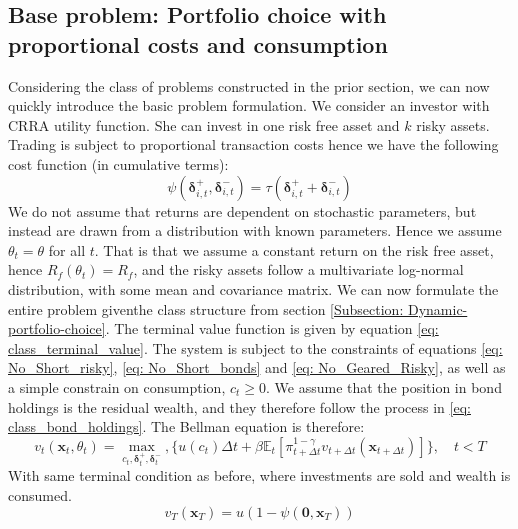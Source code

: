 \documentclass[11pt]{article}
\begin{document}
\subsection{Base problem: Portfolio choice with proportional costs and consumption}\label{Subsection: Base_Problem}
Considering the class of problems constructed in the prior section,
we can now quickly introduce the basic problem formulation.
We consider an investor with CRRA utility function. She can invest in one risk free asset and $k$ risky assets.
Trading is subject to proportional transaction costs hence we have the following cost function (in cumulative terms):
\begin{equation} \label{eq: base_model_transaction-cost}
  \psi (\boldsymbol{\delta}^{+}_{i,t}, \boldsymbol{\delta}^{-}_{i,t} ) = \tau (\boldsymbol{\delta}^{+}_{i,t} + \boldsymbol{\delta}^{-}_{i,t}) 
\end{equation}
We do not assume that returns are dependent on stochastic parameters, but instead are drawn from a distribution with known parameters.
Hence we assume \( \theta_{t} = \theta \) for all $t$. That is that we assume a constant return on the risk free asset, hence $R_{f}(\theta_t) = R_{f}$,
and the risky assets follow a multivariate log-normal distribution, with some mean and covariance matrix.
We can now formulate the entire problem giventhe class structure from section \ref{Subsection: Dynamic-portfolio-choice}.
The terminal value function is given by equation \eqref{eq: class_terminal_value}. 
The system is subject to the constraints of equations \eqref{eq: No_Short_risky}, \eqref{eq: No_Short_bonds} and \eqref{eq: No_Geared_Risky},
as well as a simple constrain on consumption, $c_t \geq 0$.
We assume that the position in bond holdings is the residual wealth, and they therefore follow the process
in \eqref{eq: class_bond_holdings}. The Bellman equation is therefore:
\[  
  v_{t} (\mathbf{x}_{t}, \theta_t) = \max_{c_t , \boldsymbol{\delta}^{+}_{t}, \boldsymbol{\delta}^{-}_{t}  },  \{ u(c_t) 
  \Delta t + \beta \mathbb{E}_{t} \left[ 
    \pi_{t+\Delta t}^{1-\gamma}
    v_{t+\Delta t} (\mathbf{x}_{t+\Delta t }) 
    \right] \} , \quad t < T 
\]
With same terminal condition as before, where investments are sold and wealth is consumed.
\[
  v_T (\mathbf{x}_T) = u  (1 - \psi( \mathbf{0},\mathbf{x}_T))
\]
\end{document}
